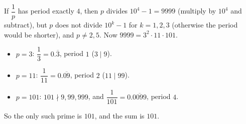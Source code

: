If $\dfrac{1}{p}$ has period exactly $4$, then $p$ divides $10^4-1=9999$ (multiply by $10^4$ and subtract), but $p$ does not divide $10^k-1$ for $k=1,2,3$ (otherwise the period would be shorter), and $p\ne2,5$. Now $9999=3^2\cdot11\cdot101$.
\begin{itemize}
\item $p=3$: $\dfrac{1}{3}=0.\overline{3}$, period $1$ ($3\mid9$).
\item $p=11$: $\dfrac{1}{11}=0.\overline{09}$, period $2$ ($11\mid99$).
\item $p=101$: $101\nmid9,99,999$, and $\dfrac{1}{101}=0.\overline{0099}$, period $4$.
\end{itemize}
So the only such prime is $101$, and the sum is $\boxed{101}$.
